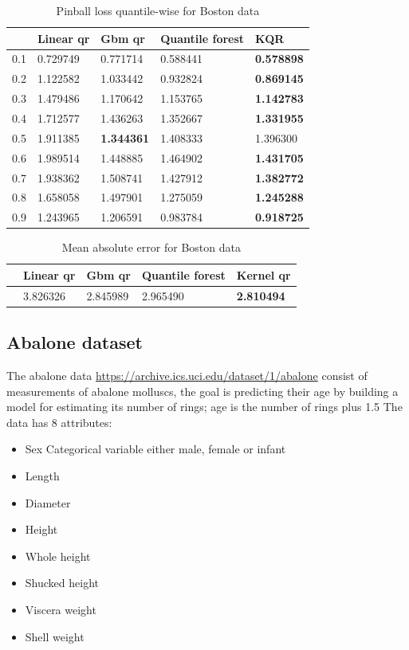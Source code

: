 \begin{table}
    \caption{Pinball loss quantile-wise for Boston data}
\begin{tabular}{lllll}
\toprule
    & Linear qr & Gbm qr & Quantile forest & KQR \\
\midrule
0.1 & 0.729749 & 0.771714 & 0.588441 & \textbf{0.578898} \\
0.2 & 1.122582 & 1.033442 & 0.932824 & \textbf{0.869145} \\
0.3 & 1.479486 & 1.170642 & 1.153765 & \textbf{1.142783} \\
0.4 & 1.712577 & 1.436263 & 1.352667 & \textbf{1.331955} \\
0.5 & 1.911385 & \textbf{1.344361} & 1.408333 & 1.396300 \\
0.6 & 1.989514 & 1.448885 & 1.464902 & \textbf{1.431705} \\
0.7 & 1.938362 & 1.508741 & 1.427912 & \textbf{1.382772} \\
0.8 & 1.658058 & 1.497901 & 1.275059 & \textbf{1.245288} \\
0.9 & 1.243965 & 1.206591 & 0.983784 & \textbf{0.918725} \\
\bottomrule
\end{tabular}
\end{table}
        
\begin{table}
\caption{Mean absolute error for Boston data}    
\begin{tabular}{lllll}
\toprule
    & Linear qr & Gbm qr & Quantile forest & Kernel qr \\
\midrule
 & 3.826326 & 2.845989 & 2.965490 & \textbf{2.810494} \\
\bottomrule
\end{tabular}

\end{table}

\subsection{Abalone dataset}
The abalone data \href{https://archive.ics.uci.edu/dataset/1/abalone}{https://archive.ics.uci.edu/dataset/1/abalone} consist of measurements of abalone molluscs, the goal is predicting their age by building a model for estimating its number of rings; age is the number of rings plus 1.5
The data has 8 attributes:
\begin{itemize}
    \item Sex Categorical variable either male, female or infant
    \item Length
    \item Diameter
    \item Height
    \item Whole height
    \item Shucked height
    \item Viscera weight
    \item Shell weight
\end{itemize}

